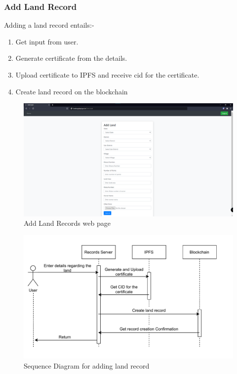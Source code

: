 \documentclass{article}
\begin{document}
        

        \subsubsection{Add Land Record}
            Adding a land record entails:-
            \begin{enumerate}
                \item Get input from user.
                \item Generate certificate from the details.
                \item Upload certificate to IPFS and receive \gls{cid} for the certificate.
                \item Create land record on the blockchain
            \end{enumerate}

            \begin{figure}[htbp]
                \includegraphics[scale=0.25]{records_add}
                \centering
                \caption{Add Land Records web page}
            \end{figure}
            \begin{figure}[htbp]
                \includegraphics[scale=0.25]{records_seq_add}
                \centering
                \caption{Sequence Diagram for adding land record}
            \end{figure}
        
\end{document}
